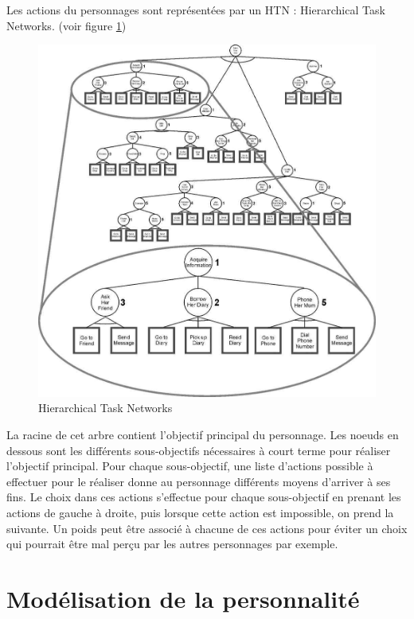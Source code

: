 \documentclass[asi]{picINSA}
\begin{document}
Les actions du personnages sont représentées par un HTN : Hierarchical Task Networks. (voir figure \ref{fig:htn})\\
\begin{figure}[h!]
  \centering
  \includegraphics[scale=0.4]{images/htn.png}
  \caption{Hierarchical Task Networks}
  \label{fig:htn}
\end{figure}

La racine de cet arbre contient l'objectif principal du personnage. Les noeuds en dessous sont les différents sous-objectifs nécessaires à court terme pour réaliser l'objectif principal. Pour chaque sous-objectif, une liste d'actions possible à effectuer pour le réaliser donne au personnage différents moyens d'arriver à ses fins. Le choix dans ces actions s'effectue pour chaque sous-objectif en prenant les actions de gauche à droite, puis lorsque cette action est impossible, on prend la suivante. Un poids peut être associé à chacune de ces actions pour éviter un choix qui pourrait être mal perçu par les autres personnages par exemple.\\


\section{Modélisation de la personnalité}
\end{document}
